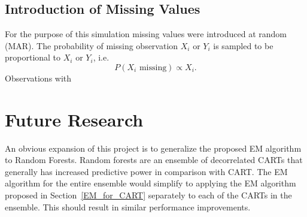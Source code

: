 \documentclass[12pt, twoside]{article}
\newcommand{\1}{\mathbb{1}}
\begin{document}
\subsection{Introduction of Missing Values}
For the purpose of this simulation missing values were introduced at random (MAR). The probability of missing observation $X_i$ or $Y_i$ is sampled to be proportional to $X_i$ or $Y_i$, i.e.\
$$P(X_i \text{ missing}) \propto X_i.$$
Observations with






\section{Future Research}
An obvious expansion of this project is to generalize the proposed EM algorithm to Random Forests. Random forests are an ensemble of decorrelated CARTs \citep{breiman} that generally has increased predictive power in comparison with CART.
The EM algorithm for the entire ensemble would simplify to applying the EM algorithm proposed in Section~\ref{EM_for_CART} separately to each of the CARTs in the ensemble. This should result in similar performance improvements.



\clearpage
 
{}

\end{document}
